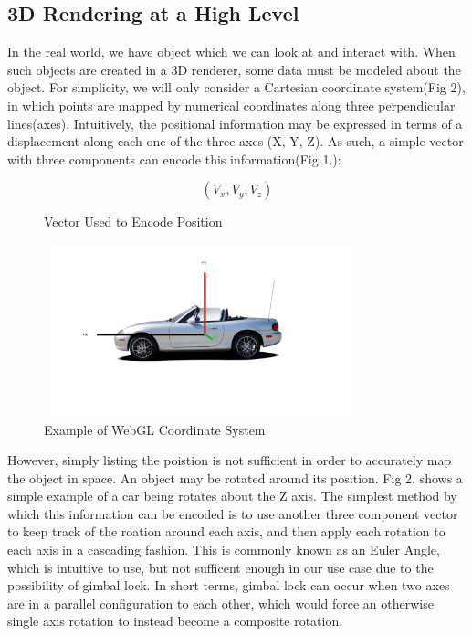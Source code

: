 \documentclass[conference]{IEEEtran}
\begin{document}
\subsection{3D Rendering at a High Level}

In the real world, we have object which we can look at and interact with. When such objects are created in a 3D renderer,
some data must be modeled about the object. For simplicity, we will only consider a Cartesian coordinate system(Fig 2), in which points are mapped
by numerical coordinates along three perpendicular lines(axes). Intuitively, the positional information may be expressed in terms of a displacement
along each one of the three axes (X, Y, Z). As such, a simple vector with three components can encode this information(Fig 1.):

\begin{figure}[htbp]
\[ (V_{x}, V_{y}, V_{z}) \]
\caption{Vector Used to Encode Position}
\end{figure}

\begin{figure}[htbp]
\centerline{\includegraphics [width = 9cm, height = 5cm] {fig1.png}}
\caption{Example of WebGL Coordinate System}
\end{figure}

However, simply listing the poistion is not sufficient in order to accurately map the object in space. An object may be rotated
around its position. Fig 2. shows a simple example of a car being rotates about the Z axis. The simplest method by which this information can be encoded
is to use another three component vector to keep track of the roation around each axis, and then apply each rotation to each axis in a cascading fashion.
This is commonly known as an Euler Angle, which is intuitive to use, but not sufficent enough in our use case due to the possibility of gimbal lock.
In short terms, gimbal lock can occur when two axes are in a parallel configuration to each other, which would force an otherwise single axis rotation to instead
become a composite rotation.
\end{document}
